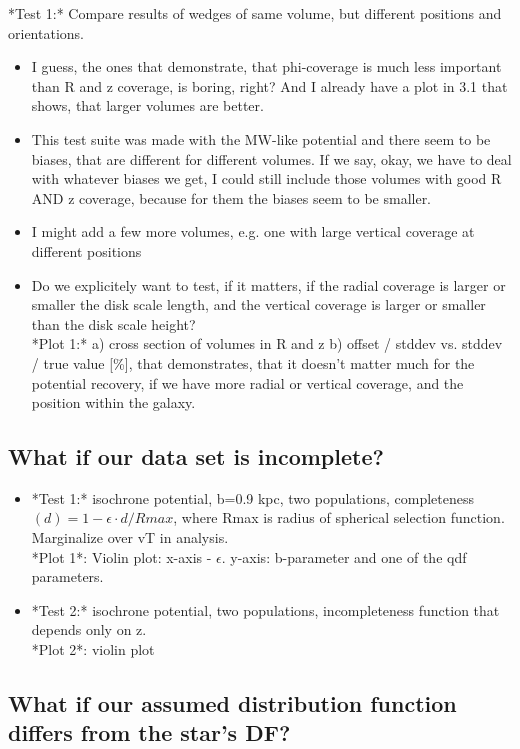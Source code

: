 \documentclass[12pt,preprint]{aastex}
\begin{document}
 *Test 1:* Compare results of wedges of same volume, but different positions and orientations. 
 \begin{itemize}
    \item I guess, the ones that demonstrate, that phi-coverage is much less important than R and z coverage, is boring, right? And I already have a plot in 3.1 that shows, that larger volumes are better. 
    \item This test suite was made with the MW-like potential and there seem to be biases, that are different for different volumes. If we say, okay, we have to deal with whatever biases we get, I could still include those volumes with good R AND z coverage, because for them the biases seem to be smaller.
    \item I might add a few more volumes, e.g. one with large vertical coverage at different positions
    \item Do we explicitely want to test, if it matters, if the radial coverage is larger or smaller the disk scale length, and the vertical coverage is larger or smaller than the disk scale height?\\
*Plot 1:* 
    a) cross section of volumes in R and z
    b) offset / stddev vs. stddev / true value [\%], that demonstrates, that it doesn't matter much for the potential recovery, if we have more radial or vertical coverage, and the position within the galaxy. 
     \end{itemize}
     
\subsection{What if our data set is incomplete?}

\begin{itemize}
\item  *Test 1:* isochrone potential, b=0.9 kpc, two populations, completeness$(d) = 1 - \epsilon \cdot d/Rmax$, where Rmax is radius of spherical selection function. Marginalize over vT in analysis. \\
*Plot 1*: Violin plot: x-axis - $\epsilon$. y-axis: b-parameter and one of the qdf parameters.
\item  *Test 2:* isochrone potential, two populations, incompleteness function that depends only on z. \\
*Plot 2*: violin plot
\end{itemize}

\subsection{What if our assumed distribution function differs from the star's DF?}
\end{document}
